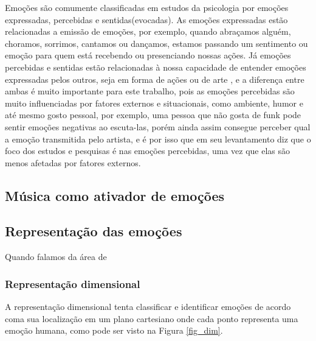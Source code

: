 \documentclass[
	12pt,				%
	openright,			%
	oneside,
	a4paper,			%
	english,			%
	french,				%
	spanish,			%
	brazil				%
	]{abntex2}
\begin{document}
 Emoções são comumente classificadas em estudos da psicologia por emoções expressadas, percebidas e sentidas(evocadas)\cite{gabrielsson2001emotion}. As emoções expressadas estão relacionadas a emissão de emoções, por exemplo, quando abraçamos alguém, choramos, sorrimos, cantamos ou dançamos, estamos passando um sentimento ou emoção para quem está recebendo ou presenciando nossas ações. Já emoções percebidas e sentidas estão relacionadas à nossa capacidade de entender emoções expressadas pelos outros, seja em forma de ações ou de arte \cite{yang2012machine}, e a diferença entre ambas é muito importante para este trabalho, pois as emoções percebidas são muito influenciadas por fatores externos e situacionais, como ambiente, humor e até mesmo gosto pessoal, por exemplo, uma pessoa que não gosta de funk pode sentir emoções negativas ao escuta-las, porém ainda assim consegue perceber qual a emoção transmitida pelo artista, e é por isso que em seu levantamento  diz que o foco dos estudos e pesquisas é nas emoções percebidas, uma vez que elas são menos afetadas por fatores externos.

\subsection{Música como ativador de emoções}



\subsection{Representação das emoções} 
Quando falamos da área de  


\subsubsection{Representação dimensional}
A representação dimensional tenta classificar e identificar emoções de acordo coma sua localização em um plano cartesiano onde cada ponto representa uma emoção humana, como pode ser visto na Figura \ref{fig_dim}.
\end{document}
